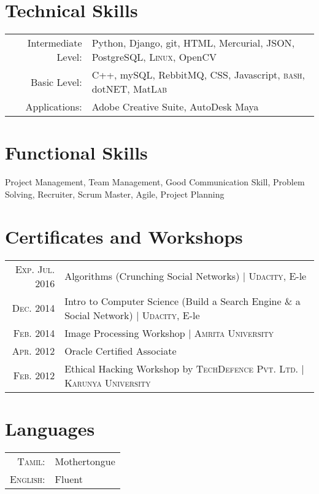 \documentclass[a4paper,10pt]{article}
\begin{document}
\section{Technical Skills}
\begin{tabular}{rl}
 Intermediate Level:& Python, Django, git, \textsc{HTML}, Mercurial, \textsc{JSON}, Postgre\textsc{SQL},  \textsc{Linux}, Open\textsc{CV} \setmainfont[SmallCapsFont=Fontin-SmallCaps.otf]{Fontin.otf}\\
 Basic Level:& \textsc{C++}, my\textsc{SQL}, RebbitMQ, \textsc{CSS}, Javascript, \textsc{bash}, dot\textsc{NET}, Mat\textsc{Lab}\\
Applications:& Adobe Creative Suite, AutoDesk Maya\\
\end{tabular}

\section{Functional Skills}
Project Management, Team Management, Good Communication Skill, Problem Solving, Recruiter, Scrum Master, Agile, Project Planning \\

\section{Certificates and Workshops}
\begin{tabular}{rl}
\textsc{Exp. Jul.} 2016 & Algorithms {\footnotesize{(Crunching Social Networks)}} | \textsc{Udacity}, E-le\\
\textsc{Dec.} 2014 & Intro to Computer Science {\footnotesize{(Build a Search Engine \& a Social Network)}} | \textsc{Udacity}, E-le\\
\textsc{Feb.} 2014 & Image Processing Workshop | {\textsc{Amrita University}}\\
\textsc{Apr.} 2012 & Oracle Certified Associate\\
\textsc{Feb.} 2012 & Ethical Hacking Workshop by {\textsc{TechDefence Pvt. Ltd.}} | {\textsc{Karunya University}}
\end{tabular}

\section{Languages}
\begin{tabular}{rl}
 \textsc{Tamil:}&Mothertongue\\
\textsc{English:}&Fluent\\
\end{tabular}
\end{document}
